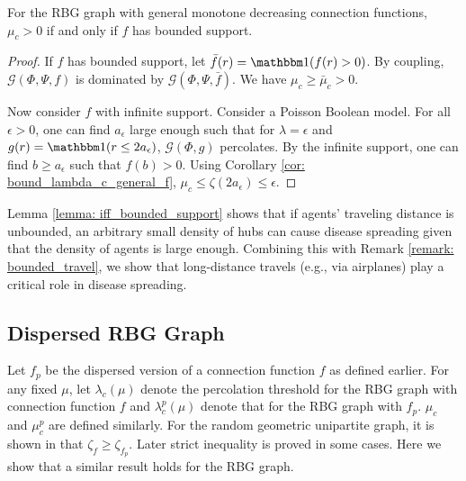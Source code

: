 \begin{lemma}
For the RBG graph with general monotone decreasing connection functions,   $\mu_c>0$ if and only if $f$ has bounded support.
\label{lemma: iff_bounded_support}
\end{lemma}
\begin{proof}
If $f$ has bounded support, let $\bar{f}(r) = \ind(f(r)>0)$. By coupling, $\mathcal{G}(\Phi,\Psi,f)$ is dominated by $\mathcal{G}(\Phi,\Psi,\bar{f})$. We have $\mu_c \geq \bar{\mu}_c >0$.

   Now consider $f$ with infinite support. Consider a Poisson Boolean model. For all $\epsilon>0$, one can find $a_{\epsilon}$ large enough such that for $\lambda=\epsilon$ and $g(r)= \ind(r\leq 2a_{\epsilon})$, $\mathcal{G}(\Phi,g)$ percolates. By the infinite support, one can find $b\geq a_{\epsilon} $ such that $f(b)>0$.  Using Corollary \ref{cor: bound_lambda_c_general_f}, $\mu_c\leq \zeta(2a_{\epsilon})\leq \epsilon$.
\end{proof}
    Lemma \ref{lemma: iff_bounded_support} shows that if agents' traveling distance is unbounded, an arbitrary small density of hubs can cause disease spreading given that the density of agents is large enough. Combining this with Remark \ref{remark: bounded_travel}, we show that long-distance travels (e.g., via airplanes) play a critical role in disease spreading.




 
\subsection{Dispersed RBG Graph}
Let $f_p$ be the dispersed version of a connection function $f$ as defined earlier. For any fixed $\mu$, let $\lambda_c(\mu)$ denote the percolation threshold for the RBG graph with connection function $f$ and $\lambda_c^p(\mu)$ denote that for the RBG graph with $f_p$. $\mu_c$ and $\mu_c^p$ are defined similarly. For the random geometric unipartite graph, it is shown in \cite{Franceschetti05continuumpercolation} that $\zeta_f\geq \zeta_{f_p}$. Later strict inequality is proved in some cases. 
 Here we show that a similar result holds for the RBG graph.



